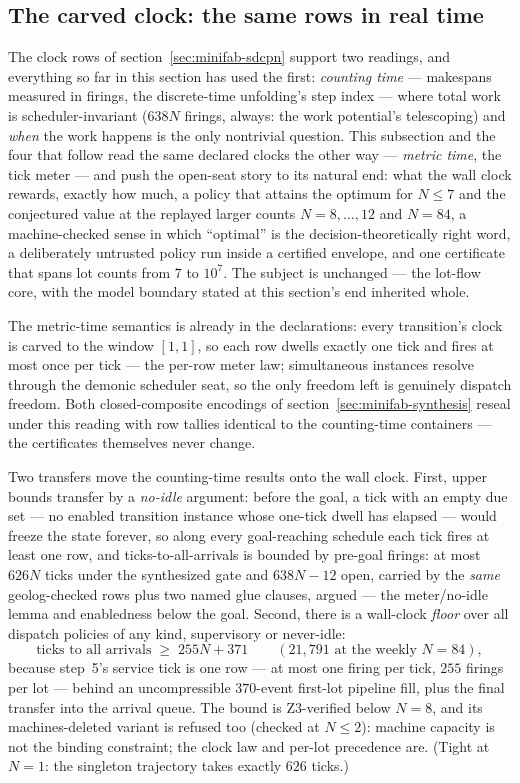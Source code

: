 \subsection{The carved clock: the same rows in real time}
\label{sec:minifab-carved}

The clock rows of section~\ref{sec:minifab-sdcpn} support two
readings, and everything so far in this section has used the first:
\emph{counting time} --- makespans measured in firings, the
discrete-time unfolding's step index --- where total work is
scheduler-invariant ($638N$ firings, always: the work potential's
telescoping) and \emph{when} the work happens is the only
nontrivial question. This subsection and the four that follow read
the same declared clocks the other way --- \emph{metric time}, the
tick meter --- and push the open-seat story to its natural end: what the
wall clock rewards, exactly how much, a policy that attains the
optimum for $N \le 7$ and the conjectured value at the replayed
larger counts $N = 8, \dots, 12$ and $N = 84$, a machine-checked sense in which ``optimal'' is the
decision-theoretically right word, a deliberately untrusted policy
run inside a certified envelope, and one certificate that spans lot
counts from $7$ to $10^{7}$. The subject is unchanged --- the
lot-flow core, with the model boundary stated at this section's end
inherited whole.

The metric-time semantics is already in the declarations: every
transition's clock is carved to the window $[1,1]$, so each row
dwells exactly one tick and fires at most once per tick --- the
per-row meter law; simultaneous instances resolve through the demonic scheduler
seat, so the only freedom left is genuinely dispatch freedom. Both
closed-composite encodings of section~\ref{sec:minifab-synthesis}
reseal under this reading with row tallies identical to the
counting-time containers --- the certificates themselves never
change.

Two transfers move the counting-time results onto the wall clock.
First, upper bounds transfer by a \emph{no-idle} argument: before
the goal, a tick with an empty due set --- no enabled transition
instance whose one-tick dwell has elapsed --- would freeze the
state forever, so along every goal-reaching schedule each tick
fires at least one row, and ticks-to-all-arrivals is bounded by
pre-goal firings: at most $626N$ ticks under the synthesized gate
and $638N - 12$ open, carried by the \emph{same} geolog-checked
rows plus two named glue clauses, argued --- the meter/no-idle
lemma and
enabledness below the goal. Second, there is a wall-clock
\emph{floor} over all dispatch policies of any kind, supervisory or
never-idle:
\[
\text{ticks to all arrivals} \;\ge\; 255N + 371
\qquad (21{,}791 \text{ at the weekly } N = 84),
\]
because step~5's service tick is one row --- at most one firing per
tick, $255$ firings per lot --- behind an uncompressible
$370$-event first-lot pipeline fill, plus the final transfer into
the arrival queue. The bound is Z3-verified below $N = 8$, and
its machines-deleted variant is refused too (checked at $N \le 2$):
machine capacity is not the binding constraint; the clock law and
per-lot precedence are. (Tight at $N = 1$: the singleton trajectory
takes exactly $626$ ticks.)

